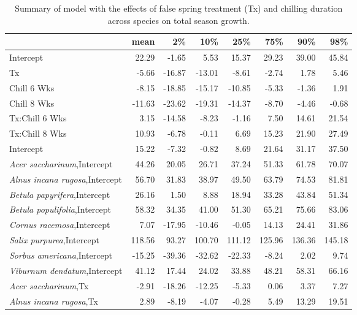 \documentclass{article}\usepackage[]{graphicx}\usepackage[]{color}
\begin{document}
\newpage
\begin{longtable}{lrrrrrrr}
\caption{Summary of model with the effects of false spring treatment (Tx) and chilling duration across species on total season growth.} \\ 
  \hline
 & mean & 2\% & 10\% & 25\% & 75\% & 90\% & 98\% \\ 
  \hline \endhead  \hline
Intercept & 22.29 & -1.65 & 5.53 & 15.37 & 29.23 & 39.00 & 45.84 \\ 
  Tx & -5.66 & -16.87 & -13.01 & -8.61 & -2.74 & 1.78 & 5.46 \\ 
  Chill 6 Wks & -8.15 & -18.85 & -15.17 & -10.85 & -5.33 & -1.36 & 1.91 \\ 
  Chill 8 Wks & -11.63 & -23.62 & -19.31 & -14.37 & -8.70 & -4.46 & -0.68 \\ 
  Tx:Chill 6 Wks & 3.15 & -14.58 & -8.23 & -1.16 & 7.50 & 14.61 & 21.54 \\ 
  Tx:Chill 8 Wks & 10.93 & -6.78 & -0.11 & 6.69 & 15.23 & 21.90 & 27.49 \\ 
  Intercept & 15.22 & -7.32 & -0.82 & 8.69 & 21.64 & 31.17 & 37.50 \\ 
  \textit{Acer saccharinum},Intercept & 44.26 & 20.05 & 26.71 & 37.24 & 51.33 & 61.78 & 70.07 \\ 
  \textit{Alnus incana rugosa},Intercept & 56.70 & 31.83 & 38.97 & 49.50 & 63.79 & 74.53 & 81.81 \\ 
  \textit{Betula papyrifera},Intercept & 26.16 & 1.50 & 8.88 & 18.94 & 33.28 & 43.84 & 51.34 \\ 
  \textit{Betula populifolia},Intercept & 58.32 & 34.35 & 41.00 & 51.30 & 65.21 & 75.66 & 83.06 \\ 
  \textit{Cornus racemosa},Intercept & 7.07 & -17.95 & -10.46 & -0.05 & 14.13 & 24.41 & 31.86 \\ 
  \textit{Salix purpurea},Intercept & 118.56 & 93.27 & 100.70 & 111.12 & 125.96 & 136.36 & 145.18 \\ 
  \textit{Sorbus americana},Intercept & -15.25 & -39.36 & -32.62 & -22.33 & -8.24 & 2.02 & 9.74 \\ 
  \textit{Viburnum dendatum},Intercept & 41.12 & 17.44 & 24.02 & 33.88 & 48.21 & 58.31 & 66.16 \\ 
  \textit{Acer saccharinum},Tx & -2.91 & -18.26 & -12.25 & -5.33 & 0.06 & 3.37 & 7.27 \\ 
  \textit{Alnus incana rugosa},Tx & 2.89 & -8.19 & -4.07 & -0.28 & 5.49 & 13.29 & 19.51 \\ 

\end{longtable}
\end{document}
